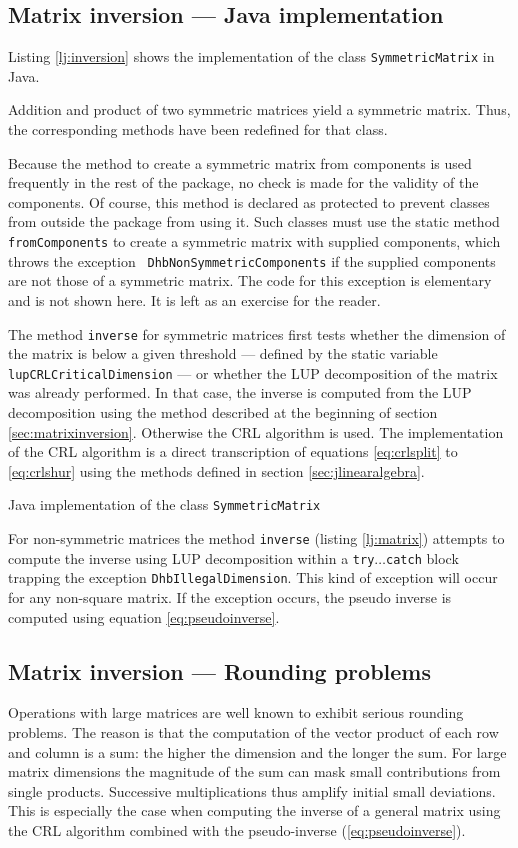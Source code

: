 \documentclass[twoside]{book}
\begin{document}
\subsection{Matrix inversion --- Java implementation}
Listing \ref{lj:inversion} shows the implementation of the class
{\tt SymmetricMatrix} in Java.

Addition and product of two symmetric matrices yield a symmetric
matrix. Thus, the corresponding methods have been redefined for
that class.

Because the method to create a symmetric matrix from components is
used frequently in the rest of the package, no check is made for
the validity of the components. Of course, this method is declared
as protected to prevent classes from outside the package from
using it. Such classes must use the static method {\tt
fromComponents} to create a symmetric matrix with supplied
components, which throws the exception {\tt
DhbNonSymmetricComponents} if the supplied components are not
those of a symmetric matrix. The code for this exception is
elementary and is not shown here. It is left as an exercise for
the reader.


The method {\tt inverse} for symmetric matrices first tests
whether the dimension of the matrix is below a given threshold ---
defined by the static variable {\tt lupCRLCriticalDimension} ---
or whether the LUP decomposition of the matrix was already
performed. In that case, the inverse is computed from the LUP
decomposition using the method described at the beginning of
section \ref{sec:matrixinversion}. Otherwise the CRL algorithm is
used. The implementation of the CRL algorithm is a direct
transcription of equations \ref{eq:crlsplit} to \ref{eq:crlshur}
using the methods defined in section \ref{sec:jlinearalgebra}.

\begin{listing} Java implementation of the class {\tt SymmetricMatrix}
\label{lj:inversion}

\end{listing}

For non-symmetric matrices the method {\tt inverse} (\cf listing
\ref{lj:matrix}) attempts to compute the inverse using LUP
decomposition within a {\tt try$\ldots$catch} block trapping the
exception {\tt DhbIllegalDimension}. This kind of exception will
occur for any non-square matrix. If the exception occurs, the
pseudo inverse is computed using equation \ref{eq:pseudoinverse}.

\subsection{Matrix inversion --- Rounding problems}
\label{sec:matrixrounding} Operations with large matrices are well
known to exhibit serious rounding problems. The reason is that the
computation of the vector product of each row and column is a sum:
the higher the dimension and the longer the sum. For large matrix
dimensions the magnitude of the sum can mask small contributions
from single products. Successive multiplications thus amplify
initial small deviations. This is especially the case when
computing the inverse of a general matrix using the CRL algorithm
combined with the pseudo-inverse (\ref{eq:pseudoinverse}).
\end{document}
